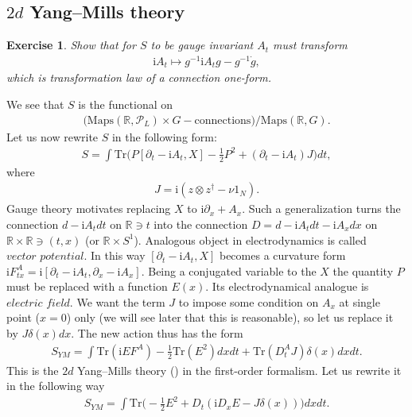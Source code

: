 \documentclass[12pt]{article}
\newtheorem{exer}{Exercise}[section]
\numberwithin{equation}{section}
\theoremstyle{definition}
\newcommand {\ii} {\mathrm{i}}
\begin{document}
\subsection{$2d$ Yang--Mills theory}
\begin{exer}\normalfont
    Show that for $S$ to be gauge invariant $A_{t}$ must transform
\begin{align*}
    {\ii} A_{t} \mapsto g^{-1} {\ii} A_t g - g^{-1} \dot g,
\end{align*}
which is transformation law of a connection one-form.
\end{exer}
We see that $S$ is the functional on
\begin{align*}
    \big( \mathrm{Maps}(\mathbb{R}, \mathcal{P}_{L}) \times G-\text{connections}\big)\big/ \mathrm{Maps}(\mathbb{R}, G).
\end{align*}
Let us now rewrite $S$ in the following form:
\begin{align*}
    S = \int \mathrm{Tr} \big( P [\partial_{t} - {\ii}A_t , X ] - \frac{1}{2}P^2 + (\partial_{t} - {\ii}A_t ) J \big)dt,
\end{align*}
where
\begin{align*}
    J = {\ii}(z \otimes z^{\dagger} - \nu 1_{N}).
\end{align*}
Gauge theory motivates replacing $X$ to ${\ii}\partial_{x} + A_x$. Such a generalization turns the connection $d - {\ii}A_{t} d t$ on $\mathbb{R} \ni t$ into the connection $D = d - {\ii}A_t d t - {\ii}A_x d x$ on $\mathbb{R} \times \mathbb{R} \ni (t, x)$ (or $\mathbb{R} \times S^{1}$). Analogous object in electrodynamics is called $\textit{vector potential}$. In this way $[\partial_{t} - {\ii}A_t , X]$ becomes a curvature form ${\ii}F_{tx}^{A} = {\ii}[\partial_{t} - {\ii}A_t , \partial_x - {\ii}A_x ]$.
Being a conjugated variable to the $X$ the quantity $P$ must be replaced with a function $E(x)$. Its electrodynamical analogue is $\textit{electric field}$. We want the term $J$ to impose some condition on $A_x$ at single point ($x = 0$) only (we will see later that this is reasonable), so let us replace it by $J \delta(x) dx$. The new action thus has the form
\begin{align*}
    S_{YM} = \int \mathrm{Tr} ({\ii} E F^{A}) - \frac{1}{2} \mathrm{Tr} (E^2) dx dt + \mathrm{Tr} (D_{t}^{A} J) \delta(x) dx dt.
\end{align*}
This is the $2d$ Yang--Mills theory (\cite{Migdal:1975}) in the first-order formalism. Let us rewrite it in the following way
\begin{align*}
    S_{YM} = \int \mathrm{Tr} \big( - \frac{1}{2} E^2 + D_{t} ({\ii}D_{x}E - J \delta(x)) \big) dx dt.
\end{align*}
\end{document}
